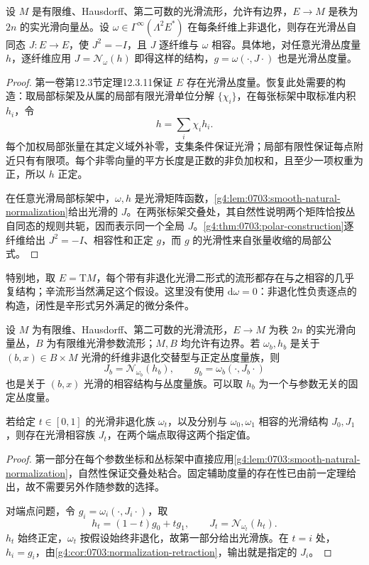 \begin{theorem}\label{g4:thm:0703:bundle-existence}
	设 \(M\) 是有限维、Hausdorff、第二可数的光滑流形，允许有边界，\(E\to M\) 是秩为 \(2n\) 的实光滑向量丛。设 \(\omega\in\Gamma^\infty(\Lambda^2E^*)\) 在每条纤维上非退化，则存在光滑丛自同态 \(J:E\to E\)，使 \(J^2=-I\)，且 \(J\) 逐纤维与 \(\omega\) 相容。具体地，对任意光滑丛度量 \(h\)，逐纤维应用 \(J=\mathcal N_\omega(h)\) 即得这样的结构，\(g=\omega(\cdot,J\cdot)\) 也是光滑丛度量。
\end{theorem}
\begin{proof}
	第一卷第12.3节定理12.3.11保证 \(E\) 存在光滑丛度量。恢复此处需要的构造：取局部标架及从属的局部有限光滑单位分解 \(\{\chi_i\}\)，在每张标架中取标准内积 \(h_i\)，令
	\[
		h=\sum_i\chi_i h_i.
	\]
	每个加权局部张量在其定义域外补零，支集条件保证光滑；局部有限性保证每点附近只有有限项。每个非零向量的平方长度是正数的非负加权和，且至少一项权重为正，所以 \(h\) 正定。

	在任意光滑局部标架中，\(\omega,h\) 是光滑矩阵函数，\cref{g4:lem:0703:smooth-natural-normalization}给出光滑的 \(J\)。在两张标架交叠处，其自然性说明两个矩阵恰按丛自同态的规则共轭，因而表示同一个全局 \(J\)。\cref{g4:thm:0703:polar-construction}逐纤维给出 \(J^2=-I\)、相容性和正定 \(g\)，而 \(g\) 的光滑性来自张量收缩的局部公式。
\end{proof}

特别地，取 \(E=\mathrm{T}M\)，每个带有非退化光滑二形式的流形都存在与之相容的几乎复结构；辛流形当然满足这个假设。这里没有使用 \(\mathrm{d}\omega=0\)：非退化性负责逐点的构造，闭性是辛形式另外满足的微分条件。

\begin{proposition}\label{g4:prop:0703:smooth-families}
	设 \(M\) 为有限维、Hausdorff、第二可数的光滑流形，\(E\to M\) 为秩 \(2n\) 的实光滑向量丛，\(B\) 为有限维光滑参数流形；\(M,B\) 均允许有边界。若 \(\omega_b,h_b\) 是关于 \((b,x)\in B\times M\) 光滑的纤维非退化交替型与正定丛度量族，则
	\[
		J_b=\mathcal N_{\omega_b}(h_b),\qquad
		g_b=\omega_b(\cdot,J_b\cdot)
	\]
	也是关于 \((b,x)\) 光滑的相容结构与丛度量族。可以取 \(h_b\) 为一个与参数无关的固定丛度量。

	若给定 \(t\in[0,1]\) 的光滑非退化族 \(\omega_t\)，以及分别与 \(\omega_0,\omega_1\) 相容的光滑结构 \(J_0,J_1\)，则存在光滑相容族 \(J_t\)，在两个端点取得这两个指定值。
\end{proposition}
\begin{proof}
	第一部分在每个参数坐标和丛标架中直接应用\cref{g4:lem:0703:smooth-natural-normalization}，自然性保证交叠处粘合。固定辅助度量的存在性已由前一定理给出，故不需要另外作随参数的选择。

	对端点问题，令 \(g_i=\omega_i(\cdot,J_i\cdot)\)，取
	\[
		h_t=(1-t)g_0+t g_1,\qquad
		J_t=\mathcal N_{\omega_t}(h_t).
	\]
	\(h_t\) 始终正定，\(\omega_t\) 按假设始终非退化，故第一部分给出光滑族。在 \(t=i\) 处，\(h_i=g_i\)，由\cref{g4:cor:0703:normalization-retraction}，输出就是指定的 \(J_i\)。
\end{proof}

